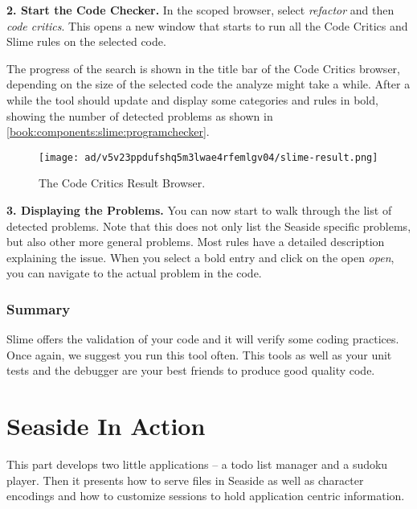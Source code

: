 \documentclass[a4paper,10pt,twoside]{book}
\begin{document}
\textbf{2. Start the Code Checker.} In the scoped browser, select \textit{refactor} and then \textit{code critics}. This opens a new window that starts to run all the Code Critics and Slime rules on the selected code.

The progress of the search is shown in the title bar of the Code Critics browser, depending on the size of the selected code the analyze might take a while. After a while the tool should update and display some categories and rules in bold, showing the number of detected problems as shown in \autoref{book:components:slime:programchecker}.

\begin{figure}[h!tbp]
	\begin{center}
		\texttt{[image: ad/v5v23ppdufshq5m3lwae4rfemlgv04/slime-result.png]}
		\caption{The Code Critics Result Browser.\label{book:components:slime:atwork:slimebrowser}}
	\end{center}
\end{figure}


\textbf{3. Displaying the Problems.} You can now start to walk through the list of detected problems. Note that this does not only list the Seaside specific problems, but also other more general problems. Most rules have a detailed description explaining the issue. When you select a bold entry and click on the open \textit{open}, you can navigate to the actual problem in the code.

\section{Summary}
\label{book:components:slime:summary}

Slime offers the validation of your code and it will verify some coding practices. Once again, we suggest you run this tool often. This tools as well as your unit tests and the debugger are your best friends to produce good quality code.

\part{Seaside In Action}
\label{book:inaction}

This part develops two little applications -- a todo list manager and a sudoku player. Then it presents how to serve files in Seaside as well as character encodings and how to customize sessions to hold application centric information.
\end{document}

